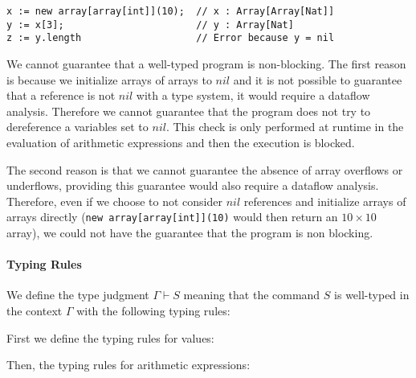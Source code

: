 \documentclass{article}
\begin{document}
\begin{lstlisting}[caption=Example of program dereferencing a nil reference., label=code:nilderef]
x := new array[array[int]](10);  // x : Array[Array[Nat]]
y := x[3];                       // y : Array[Nat]
z := y.length                    // Error because y = nil

\end{lstlisting}

We cannot guarantee that a well-typed program is non-blocking.
The first reason is because we initialize arrays of arrays to \(nil\) and it is not possible to guarantee that a reference is not \(nil\) with a type system, it would require a dataflow analysis.
Therefore we cannot guarantee that the program does not try to dereference a variables set to \(nil\). This check is only performed at runtime in the evaluation of arithmetic expressions and then the execution is  blocked.

The second reason is that we cannot guarantee the absence of  array overflows or underflows, providing this guarantee would also require a dataflow analysis.
Therefore, even if we choose to not consider \(nil\) references and initialize arrays of arrays directly (\texttt{new array[array[int]](10)} would then return an \(10 \times 10\) array), we could not have the guarantee that the program is non blocking.

\paragraph{Typing Rules}
We define the type judgment \(\Gamma \vdash S\) meaning that the command \(S\) is well-typed in the context \(\Gamma\) with the following typing rules:

First we define the typing rules for values:

Then, the typing rules for arithmetic expressions:
\end{document}
